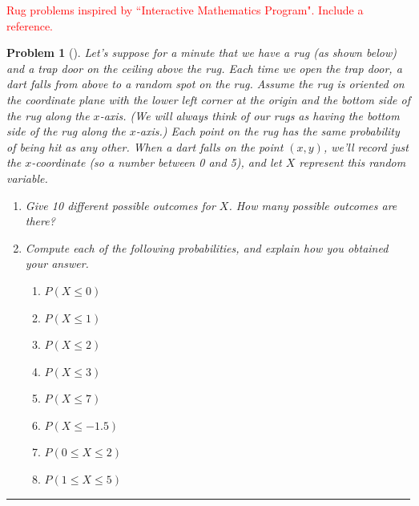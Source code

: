 \documentclass[letterpaper,oneside]{book}%
\theoremstyle{plain}
\theoremstyle{box}
\theoremstyle{problem}
\newtheorem{problemnum}{Problem}[chapter]
\newenvironment{problem}[1][]{\begin{problemnum}[#1]}{\end{problemnum}\nopagebreak\hrule\bigskip}
\begin{document}
\textcolor{red}{Rug problems inspired by ``Interactive Mathematics Program". Include a reference.}
\begin{problem}
\label{D1_Rug}
Let's suppose for a minute that we have a rug (as shown below) and a trap door on the ceiling above the rug. 
Each time we open the trap door, a dart falls from above to a random spot on the rug. 
Assume the rug is oriented on the coordinate plane with the lower left corner at the origin and the bottom side of the rug along the $x$-axis. (We will always think of our rugs as having the bottom side of the rug along the $x$-axis.) Each point on the rug has the same probability of being hit as any other. 
When a dart falls on the point $(x,y)$,  we'll record just the $x$-coordinate (so a number between 0 and 5), and let $X$ represent this random variable. 
 
 
 \begin{enumerate}
  \item Give 10 different possible outcomes for $X$. How many possible outcomes are there?
  \item Compute each of the following probabilities, and explain how you obtained your answer.
   \begin{enumerate}
    \item $P(X \leq 0)$
    \item $P(X \leq 1)$
    \item $P(X \leq 2)$
    \item $P(X \leq 3)$
    \item $P(X \leq 7)$
    \item $P(X \leq -1.5)$
    \item $P(0 \leq X \leq 2)$
    \item $P(1 \leq X \leq 5)$
   \end{enumerate}
  \end{enumerate}
\end{problem}
\end{document}
